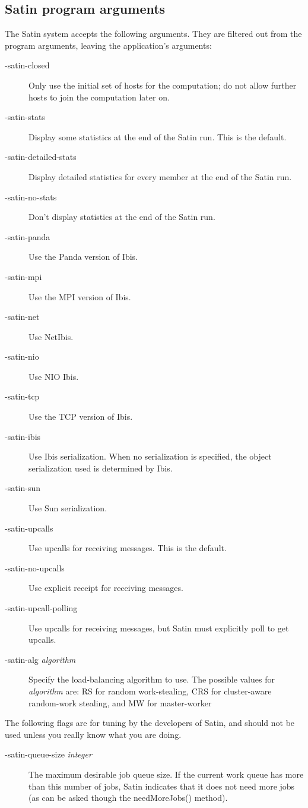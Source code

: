 \documentclass[10pt]{article}
\newcommand{\mysubsection}[1]{\subsection{#1}\label{#1}}
\begin{document}
\mysubsection{Satin program arguments}

The Satin system accepts the following arguments. They are
filtered out from the program arguments, leaving the application's
arguments:
\begin{description}
\item[-satin-closed]
Only use the initial set of hosts for the computation; do not allow
further hosts to join the computation later on.
\item[-satin-stats]
Display some statistics at the end of the Satin run. This is the default.
\item[-satin-detailed-stats]
Display detailed statistics for every member at the end of the Satin run.
\item[-satin-no-stats]
Don't display statistics at the end of the Satin run.
\item[-satin-panda]
Use the Panda version of Ibis.
\item[-satin-mpi]
Use the MPI version of Ibis.
\item[-satin-net]
Use NetIbis.
\item[-satin-nio]
Use NIO Ibis.
\item[-satin-tcp]
Use the TCP version of Ibis.
\item[-satin-ibis]
Use Ibis serialization. When no serialization is specified,
the object serialization used is determined by Ibis.
\item[-satin-sun]
Use Sun serialization.
\item[-satin-upcalls]
Use upcalls for receiving messages. This is the default.
\item[-satin-no-upcalls]
Use explicit receipt for receiving messages.
\item[-satin-upcall-polling]
Use upcalls for receiving messages, but Satin must explicitly poll to get
upcalls.
\item[-satin-alg \emph{algorithm}]
Specify the load-balancing algorithm to use. The possible values for
\emph{algorithm} are: RS for random work-stealing, CRS for cluster-aware
random-work stealing, and MW for master-worker
\end{description}

The following flags are for tuning by the developers of Satin,
and should not be used unless you really know what you are doing.
\begin{description}
\item[-satin-queue-size \emph{integer}]
The maximum desirable job queue size. If the current work queue 
has more than this number of jobs, Satin indicates that 
it does not need more jobs (as can be asked though the
needMoreJobs() method).
\end{description}
\end{document}

